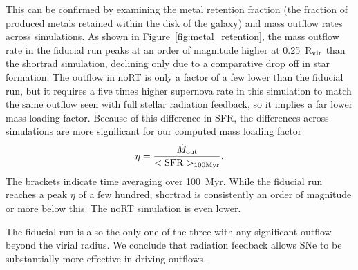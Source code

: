 \documentclass[twocolumn]{aastex62}
\begin{document}
This can be confirmed by examining the metal retention fraction (the fraction of produced metals retained within the disk of the galaxy) and mass outflow rates across simulations. As shown in Figure~\ref{fig:metal_retention}, the mass outflow rate in the fiducial run peaks at an order of magnitude higher at 0.25~R$_{\rm vir}$ than the shortrad simulation, declining only due to a comparative drop off in star formation. The outflow in noRT is only a factor of a few lower than the fiducial run, but it requires a five times higher supernova rate in this simulation to match the same outflow seen with full stellar radiation feedback, so it implies a far lower mass loading factor. Because of this difference in SFR, 
the differences across simulations are more significant for our computed mass loading factor 
\begin{equation}
    \eta = \frac{ \dot{M}_{\rm out}}{ <\rm{SFR}>_{100 \rm{Myr}}}.
\end{equation} The brackets indicate time averaging over 100~Myr.
%
While the fiducial run reaches a peak $\eta$ of a few hundred, shortrad is consistently an order of magnitude or more below this. The noRT simulation is even lower. 

The fiducial run is also the only one of the three with any significant outflow beyond the virial radius. We conclude that radiation feedback allows SNe to be substantially more effective in driving outflows. 
\end{document}
